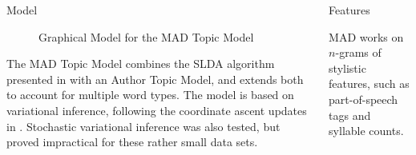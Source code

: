 \documentclass[final]{beamer}
\newlength{\onecolwid}
\newlength{\twocolwid}
\begin{document}
\begin{frame}[t]
\begin{columns}[t]
\begin{column}{\twocolwid}
\begin{columns}[t,totalwidth=\twocolwid]
\begin{column}{\onecolwid}
\begin{block}{Model}
\begin{figure}[h!]
\begin{tikzpicture}
  \end{tikzpicture}
  \caption{Graphical Model for the MAD Topic Model}
\end{figure}
The MAD Topic Model combines the SLDA algorithm presented in \cite{wang2009simultaneous} with an Author Topic Model, and extends both to account for multiple word types. The model is based on variational inference, following the coordinate ascent updates in \cite{wang2009simultaneous}. Stochastic variational inference was also tested, but proved impractical for these rather small data sets. 

\end{block}


\end{column} %

\begin{column}{\onecolwid}\vspace{-.6in} %


\begin{block}{Features}

MAD works on $n$-grams of stylistic features, such as part-of-speech tags and syllable counts.


\end{block}
\end{column}
\end{columns}
\end{column}
\end{columns}
\end{frame}
\end{document}
